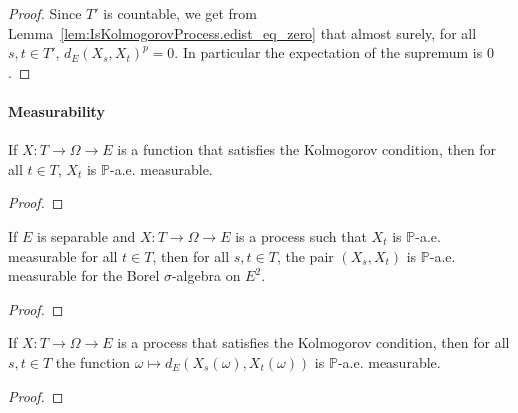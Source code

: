 \begin{proof}\leanok
Since $T'$ is countable, we get from Lemma~\ref{lem:IsKolmogorovProcess.edist_eq_zero} that almost surely, for all $s, t \in T'$, $d_E(X_s, X_t)^p = 0$.
In particular the expectation of the supremum is $0$.
\end{proof}


\paragraph{Measurability}

\begin{lemma}\label{lem:IsKolmogorovProcess.aemeasurable}
  \mathlibok
If $X : T \to \Omega \to E$ is a function that satisfies the Kolmogorov condition, then for all $t \in T$, $X_t$ is $\mathbb{P}$-a.e. measurable.
\end{lemma}

\begin{proof}\leanok

\end{proof}


\begin{lemma}\label{lem:aemeasurable_pair_of_aemeasurable}
  \leanok
If $E$ is separable and $X : T \to \Omega \to E$ is a process such that $X_t$ is $\mathbb{P}$-a.e. measurable for all $t \in T$, then for all $s, t \in T$, the pair $(X_s, X_t)$ is $\mathbb{P}$-a.e. measurable for the Borel $\sigma$-algebra on $E^2$.
\end{lemma}

\begin{proof}\leanok

\end{proof}


\begin{lemma}\label{lem:IsKolmogorovProcess.aemeasurable_edist}
  \mathlibok
If $X : T \to \Omega \to E$ is a process that satisfies the Kolmogorov condition, then for all $s,t \in T$ the function $\omega \mapsto d_E(X_s(\omega), X_t(\omega))$ is $\mathbb{P}$-a.e. measurable.
\end{lemma}

\begin{proof}\leanok

\end{proof}

